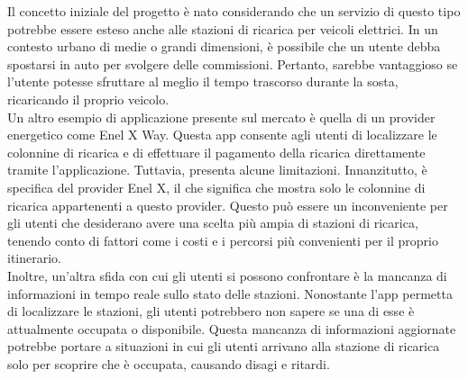 Il concetto iniziale del progetto è nato considerando che un servizio di questo tipo potrebbe essere esteso anche
alle stazioni di ricarica per veicoli elettrici. In un contesto urbano di medie o grandi dimensioni, è possibile
che un utente debba spostarsi in auto per svolgere delle commissioni. Pertanto, sarebbe vantaggioso se l'utente
potesse sfruttare al meglio il tempo trascorso durante la sosta, ricaricando il proprio veicolo.\\


Un altro esempio di applicazione presente sul mercato è quella di un provider energetico come Enel X Way\cite{enelx}.
Questa app consente agli utenti di localizzare le colonnine di ricarica e di effettuare il pagamento della
ricarica direttamente tramite l'applicazione. Tuttavia, presenta alcune limitazioni. Innanzitutto,
è specifica del provider Enel X, il che significa che mostra solo le colonnine di ricarica appartenenti
a questo provider. Questo può essere un inconveniente per gli utenti che desiderano avere una scelta più
ampia di stazioni di ricarica, tenendo conto di fattori come i costi e i percorsi più convenienti per il proprio itinerario.\\

Inoltre, un'altra sfida con cui gli utenti si possono confrontare è la mancanza di informazioni in tempo
reale sullo stato delle stazioni. Nonostante l'app permetta di localizzare le stazioni, gli utenti potrebbero
non sapere se una di esse è attualmente occupata o disponibile. Questa mancanza di informazioni aggiornate
potrebbe portare a situazioni in cui gli utenti arrivano alla stazione di ricarica solo per scoprire che è
occupata, causando disagi e ritardi.





